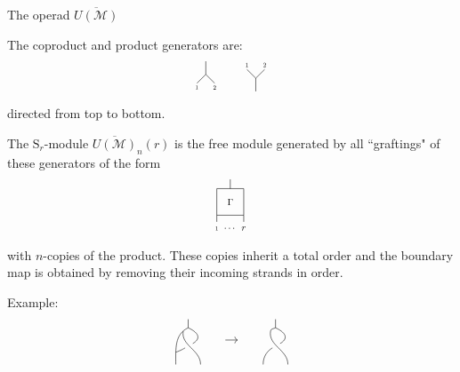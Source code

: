 \documentclass[10pt,t]{beamer}
\renewcommand{\S}{\mathrm{S}}
\newcommand{\M}{\overline{U(\mathcal M)}}
\begin{document}
\begin{frame}{The operad $\M$}
	
	The coproduct and product generators are: \vspace*{-5pt}
	\begin{equation*}
	\begin{tikzpicture}[scale=.5]
	\draw (0,0)--(0,.75);
	\draw (0,0)--(.5,-.5);
	\draw (0,0)--(-.5,-.5);
	\node[scale=.5] at (-.5,-.75){1};
	\node[scale=.5] at (.5,-.75){2};
	\end{tikzpicture}
	\qquad
	\begin{tikzpicture}[scale=.5]
	\draw (0,0)--(0,-.75);
	\draw (0,0)--(.5,.5);
	\draw (0,0)--(-.5,.5);
	\node[scale=.5] at (-.5,.75){1};
	\node[scale=.5] at (.5,.75){2};
	\end{tikzpicture}
	\vspace*{-10pt}
	\end{equation*}
	directed from top to bottom.
	
	\pause \vspace*{10pt}
	
	The $\S_r$-module $\M_n(r)$ is the free module generated by all ``graftings" of these generators of the form \vspace*{-15pt}
	\begin{equation*}
	\begin{tikzpicture}[scale=.75]
	\draw (-.5,1)--(.5,1)--(.5,0)--(-.5,0)--(-.5,1);
	\node[scale=.75] at (0,.5){$\Gamma$};
	\draw (0,1)--(0,1.35);
	\draw (-.5,0)--(-.5,-.25);
	\node[scale=.5] at (-.5,-.5){1};
	\draw (.5,0)--(.5,-.25);
	\node[scale=.75] at (.5,-.5){$r$};
	\node[scale=.75] at (0,-.5){$\cdots$};
	\end{tikzpicture}
	\vspace*{-10pt}
	\end{equation*}
	with $n$-copies of the product. \pause These copies inherit a total order and the boundary map is obtained by removing their incoming strands in order. \vspace*{5pt}
	
	\textcolor{pblue}{Example:}
	\begin{equation*}
	\begin{tikzpicture}[scale=.35]
	\draw (1,3.7) to (1,3); 
	\draw (1,3) to [out=205, in=90] (0,0);
	\draw [shorten >= 0cm] (.6,2.73) to [out=-100, in=90] (2,0);
	\draw [shorten >= .15cm] (1,3) to [out=-25, in=30, distance=1.1cm] (1,1.5);
	\draw [shorten <= .1cm] (1,1.5) to [out=210, in=20] (0,1);
	
	\draw[->] (4,2) to (5,2);
	\end{tikzpicture}
	\qquad %
	\begin{tikzpicture}[scale=.35]
	\draw (1,3.7) to (1,3); 
	\draw (1,3) to [out=205, in=90] (.6,2.73);
	\draw [shorten >= 0cm] (.6,2.73) to [out=-100, in=90] (2,0);
	\draw [shorten >= .15cm] (1,3) to [out=-25, in=30, distance=1.1cm] (1,1.5);
	\draw [shorten <= .1cm] (1,1.5) to [out=210, in=90] (0,0);
	

\end{tikzpicture}
\end{equation*}
\end{frame}
\end{document}
